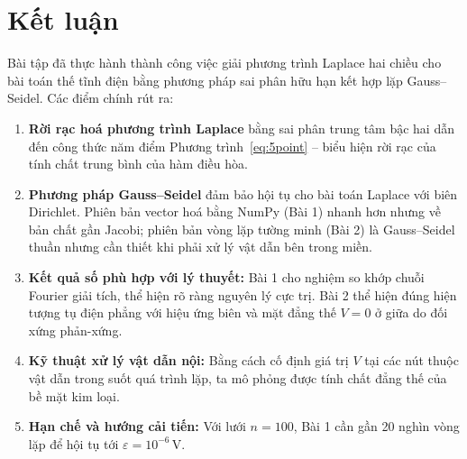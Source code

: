 \documentclass[12pt,a4paper]{article}
\begin{document}
\section{Kết luận}

Bài tập đã thực hành thành công việc giải phương trình Laplace hai chiều cho bài toán thế tĩnh điện bằng phương pháp sai phân hữu hạn kết hợp lặp Gauss--Seidel. Các điểm chính rút ra:

\begin{enumerate}
    \item \textbf{Rời rạc hoá phương trình Laplace} bằng sai phân trung tâm bậc hai dẫn đến công thức năm điểm Phương trình~\eqref{eq:5point} -- biểu hiện rời rạc của tính chất trung bình của hàm điều hòa.

    \item \textbf{Phương pháp Gauss--Seidel} đảm bảo hội tụ cho bài toán Laplace với biên Dirichlet. Phiên bản vector hoá bằng NumPy (Bài 1) nhanh hơn nhưng về bản chất gần Jacobi; phiên bản vòng lặp tường minh (Bài 2) là Gauss--Seidel thuần nhưng cần thiết khi phải xử lý vật dẫn bên trong miền.

    \item \textbf{Kết quả số phù hợp với lý thuyết:} Bài 1 cho nghiệm so khớp chuỗi Fourier giải tích, thể hiện rõ ràng nguyên lý cực trị. Bài 2 thể hiện đúng hiện tượng tụ điện phẳng với hiệu ứng biên và mặt đẳng thế $V = 0$ ở giữa do đối xứng phản-xứng.

    \item \textbf{Kỹ thuật xử lý vật dẫn nội:} Bằng cách cố định giá trị $V$ tại các nút thuộc vật dẫn trong suốt quá trình lặp, ta mô phỏng được tính chất đẳng thế của bề mặt kim loại.

    \item \textbf{Hạn chế và hướng cải tiến:} Với lưới $n = 100$, Bài 1 cần gần 20 nghìn vòng lặp để hội tụ tới $\varepsilon = 10^{-6}\,\mathrm{V}$.
\end{enumerate}
\end{document}
